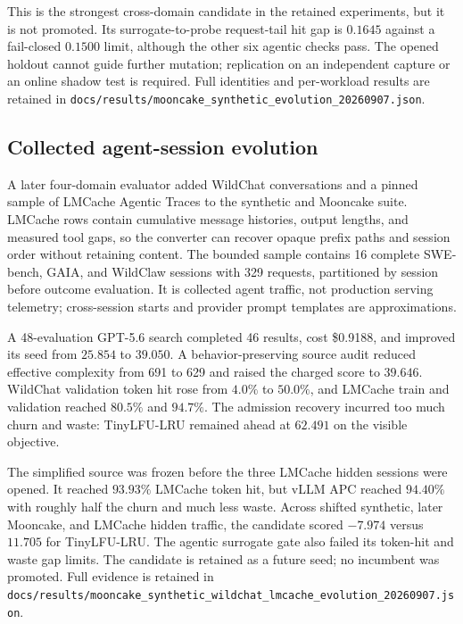 \documentclass[11pt]{article}
\newcommand{\filepath}[1]{\nolinkurl{#1}}
\begin{document}
This is the strongest cross-domain candidate in the retained experiments, but
it is not promoted.  Its surrogate-to-probe request-tail hit gap is $0.1645$
against a fail-closed $0.1500$ limit, although the other six agentic checks
pass.  The opened holdout cannot guide further mutation; replication on an
independent capture or an online shadow test is required.  Full identities and
per-workload results are retained in
\filepath{docs/results/mooncake\_synthetic\_evolution\_20260907.json}.

\subsection{Collected agent-session evolution}

A later four-domain evaluator added WildChat conversations and a pinned sample
of LMCache Agentic Traces to the synthetic and Mooncake suite.  LMCache rows
contain cumulative message histories, output lengths, and measured tool gaps,
so the converter can recover opaque prefix paths and session order without
retaining content.  The bounded sample contains 16 complete SWE-bench, GAIA,
and WildClaw sessions with 329 requests, partitioned by session before outcome
evaluation.  It is collected agent traffic, not production serving telemetry;
cross-session starts and provider prompt templates are approximations.

A 48-evaluation GPT-5.6 search completed 46 results, cost \$0.9188, and improved
its seed from $25.854$ to $39.050$.  A behavior-preserving source audit reduced
effective complexity from 691 to 629 and raised the charged score to $39.646$.
WildChat validation token hit rose from $4.0\%$ to $50.0\%$, and LMCache train
and validation reached $80.5\%$ and $94.7\%$.  The admission recovery incurred
too much churn and waste: TinyLFU-LRU remained ahead at $62.491$ on the visible
objective.

The simplified source was frozen before the three LMCache hidden sessions were
opened.  It reached $93.93\%$ LMCache token hit, but vLLM APC reached $94.40\%$
with roughly half the churn and much less waste.  Across shifted synthetic,
later Mooncake, and LMCache hidden traffic, the candidate scored $-7.974$
versus $11.705$ for TinyLFU-LRU.  The agentic surrogate gate also failed its
token-hit and waste gap limits.  The candidate is retained as a future seed;
no incumbent was promoted.  Full evidence is retained in
\filepath{docs/results/mooncake\_synthetic\_wildchat\_lmcache\_evolution\_20260907.json}.
\end{document}
